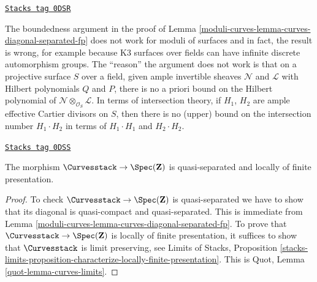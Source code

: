\begin{remark}
\label{moduli-curves-remark-boundedness-aut-does-not-work-surfaces}
\href{https://stacks.math.columbia.edu/tag/0DSR}{\texttt{Stacks tag 0DSR}}

The boundedness argument in the proof of
Lemma \ref{moduli-curves-lemma-curves-diagonal-separated-fp}
does not work for moduli of surfaces and in fact,
the result is wrong, for example because K3 surfaces
over fields can have infinite discrete automorphism groups.
The ``reason'' the argument does not work is that on a
projective surface $S$ over a field,
given ample invertible sheaves $\mathcal{N}$
and $\mathcal{L}$ with Hilbert polynomials $Q$ and $P$,
there is no a priori bound on the Hilbert polynomial
of $\mathcal{N} \otimes_{\mathcal{O}_S} \mathcal{L}$.
In terms of intersection theory, if $H_1$, $H_2$ are ample effective
Cartier divisors on $S$,
then there is no (upper) bound on the intersection number $H_1 \cdot H_2$
in terms of $H_1 \cdot H_1$ and $H_2 \cdot H_2$.
\end{remark}

\begin{lemma}
\label{moduli-curves-lemma-curves-qs-lfp}
\href{https://stacks.math.columbia.edu/tag/0DSS}{\texttt{Stacks tag 0DSS}}

The morphism $\Curvesstack \to \Spec(\mathbf{Z})$ is quasi-separated and
locally of finite presentation.
\end{lemma}

\begin{proof}
To check $\Curvesstack \to \Spec(\mathbf{Z})$ is quasi-separated we have to
show that its diagonal is quasi-compact and quasi-separated.
This is immediate from Lemma \ref{moduli-curves-lemma-curves-diagonal-separated-fp}.
To prove that $\Curvesstack \to \Spec(\mathbf{Z})$ is locally of finite
presentation, it suffices to show that $\Curvesstack$
is limit preserving, see Limits of Stacks, Proposition
\ref{stacks-limits-proposition-characterize-locally-finite-presentation}.
This is Quot, Lemma \ref{quot-lemma-curves-limits}.
\end{proof}

